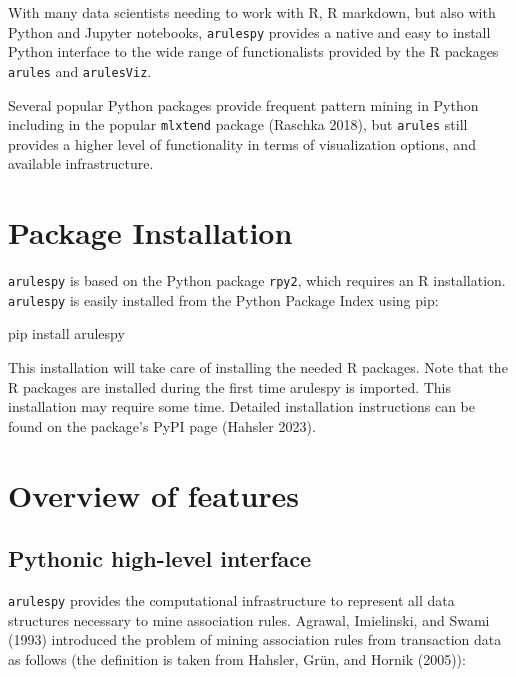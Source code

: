 \documentclass{article}
\newenvironment{Shaded}{}{}
\newcommand{\ExtensionTok}[1]{#1}
\newcommand{\NormalTok}[1]{#1}
\begin{document}
With many data scientists needing to work with R, R markdown, but also
with Python and Jupyter notebooks, \texttt{arulespy} provides a native
and easy to install Python interface to the wide range of functionalists
provided by the R packages \texttt{arules} and \texttt{arulesViz}.

Several popular Python packages provide frequent pattern mining in
Python including in the popular \texttt{mlxtend} package (Raschka 2018),
but \texttt{arules} still provides a higher level of functionality in
terms of visualization options, and available infrastructure.

\hypertarget{package-installation}{%
\section{Package Installation}\label{package-installation}}

\texttt{arulespy} is based on the Python package \texttt{rpy2}, which
requires an R installation. \texttt{arulespy} is easily installed from
the Python Package Index using pip:

\begin{Shaded}
\begin{Highlighting}[]
\ExtensionTok{pip}\NormalTok{ install arulespy}
\end{Highlighting}
\end{Shaded}

This installation will take care of installing the needed R packages.
Note that the R packages are installed during the first time arulespy is
imported. This installation may require some time. Detailed installation
instructions can be found on the package's PyPI page (Hahsler 2023).

\hypertarget{overview-of-features}{%
\section{Overview of features}\label{overview-of-features}}

\hypertarget{pythonic-high-level-interface}{%
\subsection{Pythonic high-level
interface}\label{pythonic-high-level-interface}}

\texttt{arulespy} provides the computational infrastructure to represent
all data structures necessary to mine association rules. Agrawal,
Imielinski, and Swami (1993) introduced the problem of mining
association rules from transaction data as follows (the definition is
taken from Hahsler, Grün, and Hornik (2005)):
\end{document}
